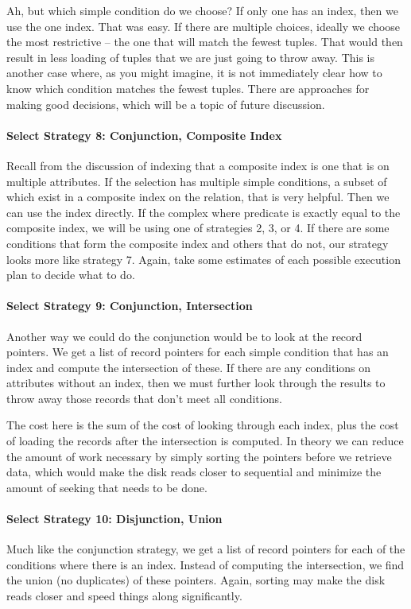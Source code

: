 \documentclass[a4paper]{report}
\begin{document}
Ah, but which simple condition do we choose? If only one has an index, then we use the one index. That was easy. If there are multiple choices, ideally we choose the most restrictive -- the one that will match the fewest tuples. That would then result in less loading of tuples that we are just going to throw away. This is another case where, as you might imagine, it is not immediately clear how to know which condition matches the fewest tuples. There are approaches for making good decisions, which will be a topic of future discussion. 

\paragraph{Select Strategy 8: Conjunction, Composite Index}
Recall from the discussion of indexing that a composite index is one that is on multiple attributes. If the selection has multiple simple conditions, a subset of which exist in a composite index on the relation, that is very helpful. Then we can use the index directly. If the complex where predicate is exactly equal to the composite index, we will be using one of strategies 2, 3, or 4. If there are some conditions that form the composite index and others that do not, our strategy looks more like strategy 7. Again, take some estimates of each possible execution plan to decide what to do.

\paragraph{Select Strategy 9: Conjunction, Intersection}
Another way we could do the conjunction would be to look at the record pointers. We get a list of record pointers for each simple condition that has an index and compute the intersection of these. If there are any conditions on attributes without an index, then we must further look through the results to throw away those records that don't meet all conditions.

The cost here is the sum of the cost of looking through each index, plus the cost of loading the records after the intersection is computed. In theory we can reduce the amount of work necessary by simply sorting the pointers before we retrieve data, which would make the disk reads closer to sequential and minimize the amount of seeking that needs to be done.

\paragraph{Select Strategy 10: Disjunction, Union}
Much like the conjunction strategy, we get a list of record pointers for each of the conditions where there is an index. Instead of computing the intersection, we find the union (no duplicates) of these pointers. Again, sorting may make the disk reads closer and speed things along significantly.
\end{document}

